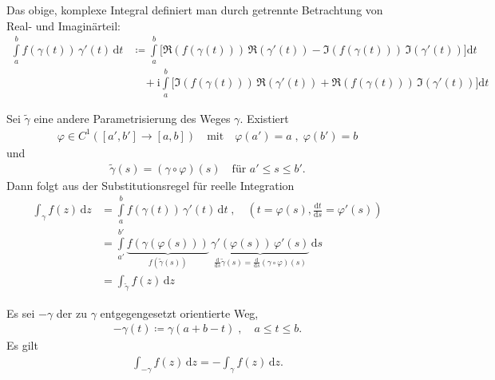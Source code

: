 \begin{notice*}
  Das obige, komplexe Integral definiert man durch getrennte Betrachtung von Real- und Imaginärteil:
    \begin{align*}
      \int\limits_{a}^{b} f(\gamma(t)) \, \gamma'(t) \, \mathrm{d}t 
      &\coloneq \int\limits_{a}^{b} \Big[ \Re(f(\gamma(t))) \, \Re(\gamma'(t)) - \Im(f(\gamma(t))) \, \Im(\gamma'(t)) \Big] \mathrm{d}t \\
      &\quad + \mathrm{i} \int\limits_{a}^{b} \Big[ \Im(f(\gamma(t))) \, \Re(\gamma'(t)) + \Re(f(\gamma(t))) \, \Im(\gamma'(t)) \Big] \mathrm{d}t
    \end{align*}
\end{notice*}

\begin{notice}
  \begin{enum-arab}
    \item Sei $\widetilde{\gamma}$ eine andere Parametrisierung des Weges $\gamma$.
      Existiert
      \begin{align*}
        \varphi \in C^1([a',b'] \to [a,b])  \quad\text{mit}\quad \varphi(a') = a \; , \; \varphi(b') = b
      \end{align*}
      und
      \begin{align*}
        \widetilde{\gamma}(s) = (\gamma \circ \varphi)(s) \quad \text{für } a' \leq s \leq b'.
      \end{align*}
    Dann folgt aus der Substitutionsregel für reelle Integration
    \begin{align*}
      \int_\gamma f(z) \, \mathrm{d}z &= \int\limits_{a}^{b} f(\gamma(t)) \, \gamma'(t) \, \mathrm{d}t \; , \quad \left(t=\varphi(s), \frac {\mathrm{d}t}{\mathrm{d}s} = \varphi'(s)\right) \\
      &= \int\limits_{a'}^{b'} \underbrace{f(\gamma(\varphi(s)))}_{f(\widetilde{\gamma}(s))} \, \underbrace{\gamma'(\varphi(s)) \, \varphi'(s)}_{\frac{\mathrm{d}}{\mathrm{d}s} \widetilde{\gamma}(s) = \frac{\mathrm{d}}{\mathrm{d}s} (\gamma \circ \varphi)(s)} \, \mathrm{d}s \\
      &= \int_{\widetilde{\gamma}} f(z) \, \mathrm{d}z
    \end{align*}
    
    \item Es sei $-\gamma$ der zu $\gamma$ entgegengesetzt orientierte Weg,
    \begin{align*}
      -\gamma(t) \coloneq \gamma(a+b-t) \; , \quad a \leq t \leq b.
    \end{align*}
    Es gilt 
    \begin{align*}
      \int_{-\gamma} f(z) \, \mathrm{d}z = - \int_{\gamma} f(z) \, \mathrm{d}z.
    \end{align*}
    

\end{enum-arab}
\end{notice}

